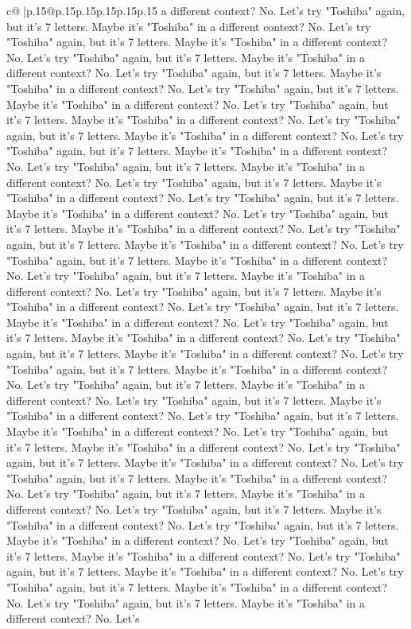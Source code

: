 \documentclass{article}
\begin{document}
{\begin{supertabular}{c@{$\;$}|p{.15\linewidth}@{}p{.15\linewidth}p{.15\linewidth}p{.15\linewidth}p{.15\linewidth}p{.15\linewidth}}
{{{a different context? No. Let's try "Toshiba" again, but it's 7 letters. Maybe it's "Toshiba" in a different context? No. Let's try "Toshiba" again, but it's 7 letters. Maybe it's "Toshiba" in a different context? No. Let's try "Toshiba" again, but it's 7 letters. Maybe it's "Toshiba" in a different context? No. Let's try "Toshiba" again, but it's 7 letters. Maybe it's "Toshiba" in a different context? No. Let's try "Toshiba" again, but it's 7 letters. Maybe it's "Toshiba" in a different context? No. Let's try "Toshiba" again, but it's 7 letters. Maybe it's "Toshiba" in a different context? No. Let's try "Toshiba" again, but it's 7 letters. Maybe it's "Toshiba" in a different context? No. Let's try "Toshiba" again, but it's 7 letters. Maybe it's "Toshiba" in a different context? No. Let's try "Toshiba" again, but it's 7 letters. Maybe it's "Toshiba" in a different context? No. Let's try "Toshiba" again, but it's 7 letters. Maybe it's "Toshiba" in a different context? No. Let's try "Toshiba" again, but it's 7 letters. Maybe it's "Toshiba" in a different context? No. Let's try "Toshiba" again, but it's 7 letters. Maybe it's "Toshiba" in a different context? No. Let's try "Toshiba" again, but it's 7 letters. Maybe it's "Toshiba" in a different context? No. Let's try "Toshiba" again, but it's 7 letters. Maybe it's "Toshiba" in a different context? No. Let's try "Toshiba" again, but it's 7 letters. Maybe it's "Toshiba" in a different context? No. Let's try "Toshiba" again, but it's 7 letters. Maybe it's "Toshiba" in a different context? No. Let's try "Toshiba" again, but it's 7 letters. Maybe it's "Toshiba" in a different context? No. Let's try "Toshiba" again, but it's 7 letters. Maybe it's "Toshiba" in a different context? No. Let's try "Toshiba" again, but it's 7 letters. Maybe it's "Toshiba" in a different context? No. Let's try "Toshiba" again, but it's 7 letters. Maybe it's "Toshiba" in a different context? No. Let's try "Toshiba" again, but it's 7 letters. Maybe it's "Toshiba" in a different context? No. Let's try "Toshiba" again, but it's 7 letters. Maybe it's "Toshiba" in a different context? No. Let's try "Toshiba" again, but it's 7 letters. Maybe it's "Toshiba" in a different context? No. Let's try "Toshiba" again, but it's 7 letters. Maybe it's "Toshiba" in a different context? No. Let's try "Toshiba" again, but it's 7 letters. Maybe it's "Toshiba" in a different context? No. Let's try "Toshiba" again, but it's 7 letters. Maybe it's "Toshiba" in a different context? No. Let's try "Toshiba" again, but it's 7 letters. Maybe it's "Toshiba" in a different context? No. Let's try "Toshiba" again, but it's 7 letters. Maybe it's "Toshiba" in a different context? No. Let's try "Toshiba" again, but it's 7 letters. Maybe it's "Toshiba" in a different context? No. Let's try "Toshiba" again, but it's 7 letters. Maybe it's "Toshiba" in a different context? No. Let's try "Toshiba" again, but it's 7 letters. Maybe it's "Toshiba" in a different context? No. Let's try "Toshiba" again, but it's 7 letters. Maybe it's "Toshiba" in a different context? No. Let's try "Toshiba" again, but it's 7 letters. Maybe it's "Toshiba" in a different context? No. Let's }}}
\end{supertabular}}
\end{document}
